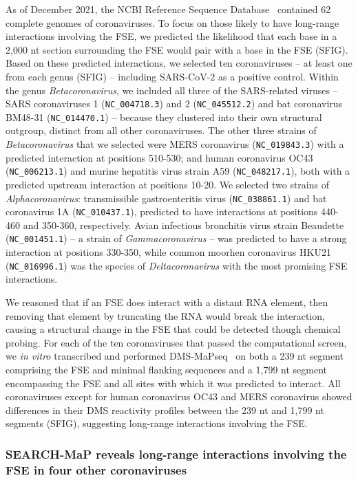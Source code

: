 \documentclass[main.tex]{subfiles}
\begin{document}
As of December 2021, the NCBI Reference Sequence Database~\cite{OLeary2016} contained 62 complete genomes of coronaviruses.
To focus on those likely to have long-range interactions involving the FSE, we predicted the likelihood that each base in a 2,000 nt section surrounding the FSE would pair with a base in the FSE (SFIG).
Based on these predicted interactions, we selected ten coronaviruses -- at least one from each genus (SFIG) -- including SARS-CoV-2 as a positive control.
Within the genus \textit{Betacoronavirus}, we included all three of the SARS-related viruses -- SARS coronaviruses 1 (\verb|NC_004718.3|) and 2 (\verb|NC_045512.2|) and bat coronavirus BM48-31 (\verb|NC_014470.1|) -- because they clustered into their own structural outgroup, distinct from all other coronaviruses.
The other three strains of \textit{Betacoronavirus} that we selected were MERS coronavirus (\verb|NC_019843.3|) with a predicted interaction at positions 510-530; and human coronavirus OC43 (\verb|NC_006213.1|) and murine hepatitis virus strain A59 (\verb|NC_048217.1|), both with a predicted upstream interaction at positions 10-20.
We selected two strains of \textit{Alphacoronavirus}: transmissible gastroenteritis virus (\verb|NC_038861.1|) and bat coronavirus 1A (\verb|NC_010437.1|), predicted to have interactions at positions 440-460 and 350-360, respectively.
Avian infectious bronchitis virus strain Beaudette (\verb|NC_001451.1|) -- a strain of \textit{Gammacoronavirus} -- was predicted to have a strong interaction at positions 330-350, while common moorhen coronavirus HKU21 (\verb|NC_016996.1|) was the species of \textit{Deltacoronavirus} with the most promising FSE interactions.

We reasoned that if an FSE does interact with a distant RNA element, then removing that element by truncating the RNA would break the interaction, causing a structural change in the FSE that could be detected though chemical probing.
For each of the ten coronaviruses that passed the computational screen, we \textit{in vitro} transcribed and performed DMS-MaPseq~\cite{Zubradt2016} on both a 239 nt segment comprising the FSE and minimal flanking sequences and a 1,799 nt segment encompassing the FSE and all sites with which it was predicted to interact.
All coronaviruses except for human coronavirus OC43 and MERS coronavirus showed differences in their DMS reactivity profiles between the 239 nt and 1,799 nt segments (SFIG), suggesting long-range interactions involving the FSE.

\subsubsection{SEARCH-MaP reveals long-range interactions involving the FSE in four other coronaviruses}
\end{document}
